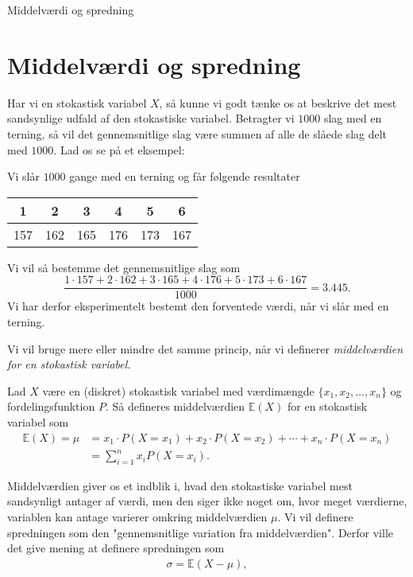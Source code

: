 

\begin{center}
\Huge
Middelværdi og spredning
\end{center}
\section*{Middelværdi og spredning}

Har vi en stokastisk variabel $X$, så kunne vi godt tænke os at beskrive det mest sandsynlige udfald af den stokastiske variabel. Betragter vi $1000$ slag med en terning, så vil det gennemsnitlige slag være summen af alle de slåede slag delt med $1000$. Lad os se på et eksempel:
\begin{exa}
Vi slår $1000$ gange med en terning og får følgende resultater
\begin{center}
\begin{tabular}{c|c|c|c|c|c}
1 & 2 & 3 & 4 & 5 & 6 \\
\hline 
157& 162& 165& 176& 173& 167
\end{tabular}
\end{center}
Vi vil så bestemme det gennemsnitlige slag som
\[
\frac{1\cdot 157 + 2\cdot 162 + 3\cdot 165 + 4 \cdot 176 + 5\cdot 173 + 6\cdot 167}{1000} = 3.445.
\]
Vi har derfor eksperimentelt bestemt den forventede værdi, når vi slår med en terning. 
\end{exa}
Vi vil bruge mere eller mindre det samme princip, når vi definerer \textit{middelværdien for en stokastisk variabel}.
\begin{defn}[Middelværdi]
Lad $X$ være en (diskret) stokastisk variabel med værdimængde $\{x_1,x_2,\hdots,x_n\}$ og fordelingsfunktion $P$. Så defineres middelværdien $\mathbb{E}(X)$ for en stokastisk variabel som
\begin{align*}
\mathbb{E}(X) = \mu &= x_1 \cdot P(X = x_1) + x_2 \cdot P(X=x_2) + \cdots + x_n \cdot P(X=x_n)\\
&= \sum_{i=1}^{n} x_i P(X=x_i).
\end{align*} 
\end{defn}
Middelværdien giver os et indblik i, hvad den stokastiske variabel mest sandsynligt antager af værdi, men den siger ikke noget om, hvor meget værdierne, variablen kan antage varierer omkring middelværdien $\mu$. Vi vil definere spredningen som den "gennemsnitlige variation fra middelværdien". Derfor ville det give mening at definere spredningen som 
\begin{align*}
\sigma = \mathbb{E}(X-\mu), 
\end{align*}
